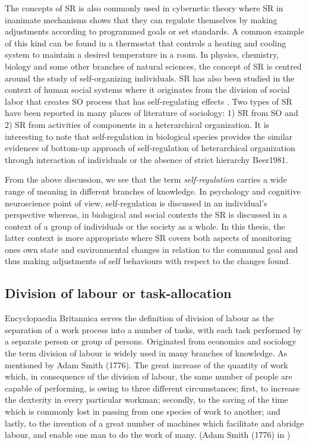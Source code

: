 The concepts of SR is also commonly used in cybernetic theory where SR in inanimate mechanisms shows that they can regulate themselves by making adjustments according to programmed goals or set standards. A common example of this kind can be found in a thermostat that controls a heating and cooling system to maintain a desired temperature in a room. In physics, chemistry, biology and some other branches of natural sciences, the concept of SR is centred around the study of self-organizing individuals. SR has also been studied in the context of human social systems where it originates from the division of social labor that creates SO process that has self-regulating effects \cite{Kppers+1990}. Two types of SR have been reported in many places of literature of sociology: 1) SR from SO and 2) SR from activities of components in a heterarchical organization. It is interesting to note that self-regulation in biological species provides the similar evidences of bottom-up approach of self-regulation of heterarchical organization through interaction of individuals or the absence of strict hierarchy {Beer1981}. 

From the above discussion, we see that the term {\em self-regulation} carries a wide range of meaning in different branches of knowledge. In psychology and cognitive neuroscience point of view, self-regulation is discussed in an individual's perspective whereas, in biological and social contexts the SR is discussed in a context of a group of individuals or the society as a whole. In  this thesis, the latter context is more appropriate where  SR covers both aspects of monitoring ones own state and environmental changes in relation to the communal goal and thus making adjustments of self behaviours with respect to the changes found. 

\subsection{Division of labour or task-allocation}
Encyclopaedia Britannica serves the definition of division of labour as the separation of a work process into a number of tasks, with each task performed by a separate person or group of persons. Originated from economics and sociology the term division of labour is widely used in many branches of knowledge. As mentioned by Adam Smith (1776).
The great increase of the quantity of work which, in consequence of the division of labour, the same number of people are capable of performing, is owing to three different circumstances; first, to increase the dexterity in every particular workman; secondly, to the saving of the time which is commonly lost in passing from one species of work to another; and lastly, to the invention of a great number of machines which facilitate and abridge labour, and   enable one man to do the work of many. (Adam Smith (1776) in \cite{Sendova-Franks+1999})

